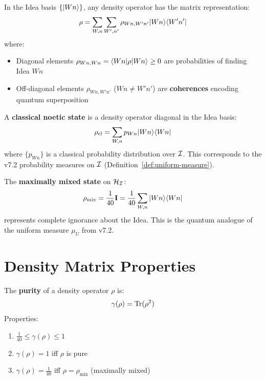 \begin{definition}
\label{def:idea-basis-density}
In the Idea basis $\{|Wn\rangle\}$, any density operator has the matrix representation:
\[
\rho = \sum_{W,n} \sum_{W',n'} \rho_{Wn,W'n'} |Wn\rangle\langle W'n'|
\]
where:
\begin{itemize}
  \item Diagonal elements $\rho_{Wn,Wn} = \langle Wn|\rho|Wn\rangle \geq 0$ are probabilities of finding Idea $Wn$
  \item Off-diagonal elements $\rho_{Wn,W'n'}$ ($Wn \neq W'n'$) are \textbf{coherences} encoding quantum superposition
\end{itemize}
\end{definition}

\begin{definition}
\label{def:classical-noetic-state}
A \textbf{classical noetic state} is a density operator diagonal in the Idea basis:
\[
\rho_{\mathrm{cl}} = \sum_{W,n} p_{Wn} |Wn\rangle\langle Wn|
\]
where $\{p_{Wn}\}$ is a classical probability distribution over $\mathcal{I}$. This corresponds to the v7.2 probability measures on $\mathcal{I}$ (Definition~\ref{def:uniform-measure}).
\end{definition}

\begin{proposition}
\label{prop:uniform-state}
The \textbf{maximally mixed state} on $\mathcal{H}_{\mathcal{I}}$:
\[
\rho_{\mathrm{mix}} = \frac{1}{40} \mathbf{I} = \frac{1}{40} \sum_{W,n} |Wn\rangle\langle Wn|
\]
represents complete ignorance about the Idea. This is the quantum analogue of the uniform measure $\mu_U$ from v7.2.
\end{proposition}

\section{Density Matrix Properties}
\label{sec:density-matrix-properties}

\begin{definition}[Purity]
\label{def:purity}
The \textbf{purity} of a density operator $\rho$ is:
\[
\gamma(\rho) = \mathrm{Tr}(\rho^2)
\]
Properties:
\begin{enumerate}
  \item $\frac{1}{40} \leq \gamma(\rho) \leq 1$
  \item $\gamma(\rho) = 1$ iff $\rho$ is pure
  \item $\gamma(\rho) = \frac{1}{40}$ iff $\rho = \rho_{\mathrm{mix}}$ (maximally mixed)
\end{enumerate}
\end{definition}

